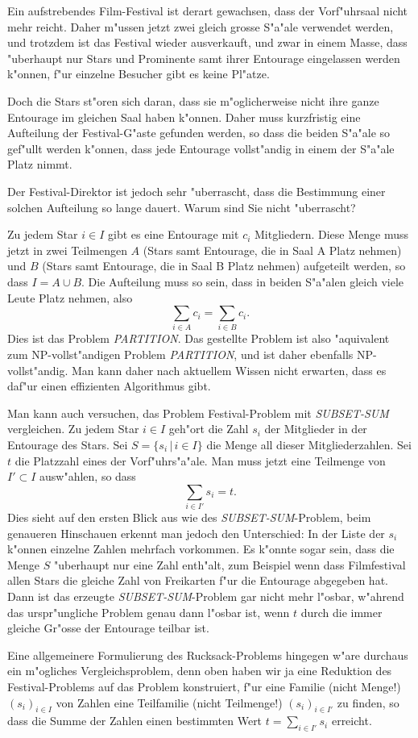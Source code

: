 Ein aufstrebendes Film-Festival ist derart gewachsen, dass der 
Vorf"uhrsaal nicht mehr reicht. Daher m"ussen jetzt zwei gleich
grosse S"a"ale verwendet werden, und trotzdem ist das Festival
wieder ausverkauft, und zwar in einem Masse, dass "uberhaupt nur Stars und Prominente
samt ihrer Entourage eingelassen werden k"onnen, f"ur
einzelne Besucher gibt es keine Pl"atze.

Doch die Stars st"oren sich daran, dass sie m"oglicherweise nicht
ihre ganze Entourage im gleichen Saal haben k"onnen. Daher muss
kurzfristig eine Aufteilung der Festival-G"aste gefunden werden,
so dass die beiden S"a"ale so gef"ullt werden k"onnen, dass
jede Entourage vollst"andig in einem der S"a"ale Platz nimmt.

Der Festival-Direktor ist jedoch sehr "uberrascht, dass die
Bestimmung einer solchen Aufteilung so lange dauert. Warum
sind Sie nicht "uberrascht?

\begin{loesung}
Zu jedem Star $i\in I$ gibt es eine Entourage mit $c_i$
Mitgliedern. Diese Menge muss jetzt in zwei Teilmengen
$A$ (Stars samt Entourage, die in Saal A Platz nehmen) und
$B$ (Stars samt Entourage, die in Saal B Platz nehmen) aufgeteilt
werden, so dass $I=A\cup B$. Die Aufteilung muss so sein, dass
in beiden S"a"alen gleich viele Leute Platz nehmen, also
\[
\sum_{i\in A}c_i=
\sum_{i\in B}c_i.
\]
Dies ist das Problem {\it PARTITION}. Das gestellte Problem ist also
"aquivalent zum NP-vollst"andigen Problem {\it PARTITION}, und ist
daher ebenfalls NP-vollst"andig. Man kann daher nach aktuellem
Wissen nicht erwarten, dass es daf"ur einen effizienten Algorithmus
gibt.
\end{loesung}

\begin{diskussion}
Man kann auch versuchen, das Problem Festival-Problem mit
{\it SUBSET-SUM} vergleichen.
Zu jedem Star $i\in I$ geh"ort die Zahl $s_i$ der Mitglieder in der
Entourage des Stars. Sei $S=\{s_i\,|\,i\in I\}$ die Menge all dieser
Mitgliederzahlen. Sei $t$ die Platzzahl eines der Vorf"uhrs"a"ale.
Man muss jetzt eine Teilmenge von $I'\subset I$ ausw"ahlen, so dass
\[
\sum_{i\in I'} s_i=t.
\]
Dies sieht auf den ersten Blick aus wie des {\it SUBSET-SUM}-Problem,
beim genaueren Hinschauen erkennt man jedoch den Unterschied: In der
Liste der $s_i$ k"onnen einzelne Zahlen mehrfach vorkommen. Es k"onnte
sogar sein, dass die Menge $S$ "uberhaupt nur eine Zahl enth"alt,
zum Beispiel wenn dass Filmfestival allen Stars die gleiche Zahl von
Freikarten f"ur die Entourage abgegeben hat. Dann ist das erzeugte
{\it SUBSET-SUM}-Problem gar nicht mehr l"osbar, w"ahrend das urspr"ungliche
Problem genau dann l"osbar ist, wenn $t$ durch die immer gleiche Gr"osse
der Entourage teilbar ist. 

Eine allgemeinere Formulierung des Rucksack-Problems hingegen w"are
durchaus ein m"ogliches Vergleichsproblem, denn oben haben wir ja
eine Reduktion des Festival-Problems auf das Problem konstruiert,
f"ur eine Familie (nicht Menge!) $(s_i)_{i\in I}$ von Zahlen eine
Teilfamilie (nicht Teilmenge!) $(s_i)_{i\in I'}$ zu finden, so dass
die Summe der Zahlen einen bestimmten Wert $t=\sum_{i\in I'}s_i$
erreicht.
\end{diskussion}


